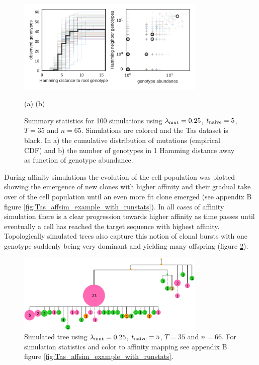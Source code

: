 \begin{figure}
    \begin{center}
    \includegraphics[width=0.8\textwidth]{figures/Tas-affsim_Tas-data.pdf}\newline%
    \end{center}
    \vspace{-14mm} \hspace{42mm} (a) \hspace{52mm} (b)
    \caption{
        \label{fig:Tas-affsim_Tas-data}
        Summary statistics for 100 simulations using $\lambda_{\text{mut}}=0.25$, $t_{\text{naive}}=5$, $T=35$ and $n=65$.
        Simulations are colored and the Tas dataset is black.
        In a) the cumulative distribution of mutations (empirical CDF) and b) the number of genotypes in 1 Hamming distance away as function of genotype abundance.
    }
\end{figure}


During affinity simulations the evolution of the cell population was plotted showing the emergence of new clones with higher affinity and their gradual take over of the cell population until an even more fit clone emerged (see appendix B figure \ref{fig:Tas_affsim_example_with_runstats}).
In all cases of affinity simulation there is a clear progression towards higher affinity as time passes until eventually a cell has reached the target sequence with highest affinity.
Topologically simulated trees also capture this notion of clonal bursts with one genotype suddenly being very dominant and yielding many offspring (figure \ref{fig:Tas_affsim_example.collapsed_runstat_color_tree}).

\begin{figure}
    \centering
    \includegraphics[width=0.8\textwidth]{figures/Tas_affsim_example_collapsed_runstat_color_tree.pdf}
    \caption{
        \label{fig:Tas_affsim_example.collapsed_runstat_color_tree}
        Simulated tree using $\lambda_{\text{mut}}=0.25$, $t_{\text{naive}}=5$, $T=35$ and $n=66$.
        For simulation statistics and color to affinity mapping see appendix B figure \ref{fig:Tas_affsim_example_with_runstats}.
    }
\end{figure}





